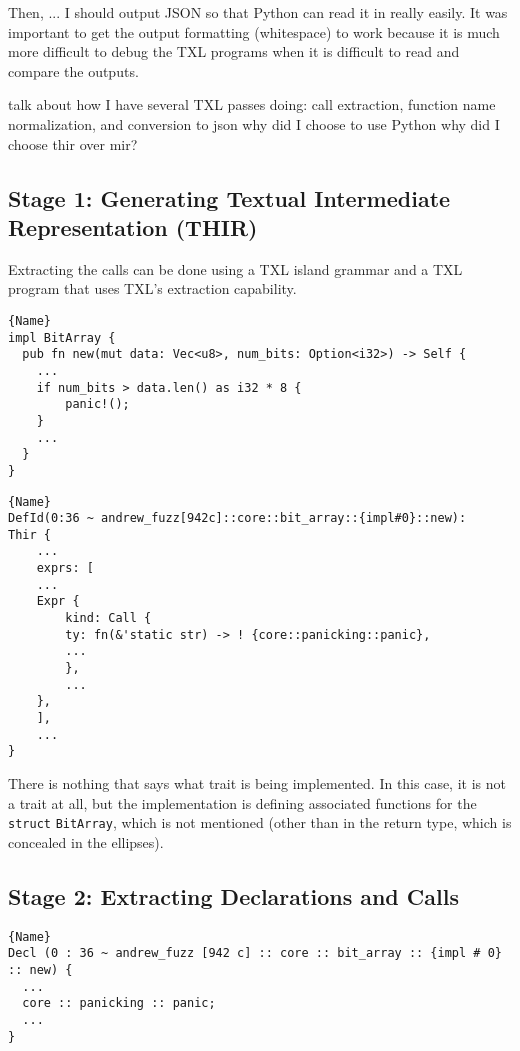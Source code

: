 \documentclass[11pt]{article}
\begin{document}
Then, ... I should output JSON so that Python can read it in really easily.
It was important to get the output formatting (whitespace) to work because it is much more difficult to debug the TXL programs when it is difficult to read and compare the outputs.

talk about how I have several TXL passes doing: call extraction, function name normalization, and conversion to json
why did I choose to use Python
why did I choose thir over mir?

\subsection{Stage 1: Generating Textual Intermediate Representation (THIR)}

Extracting the calls can be done using a TXL island grammar and a TXL program that uses TXL's extraction capability.

\begin{lstlisting}[caption=Rust Code, label=code:rust_code]{Name}
impl BitArray {
  pub fn new(mut data: Vec<u8>, num_bits: Option<i32>) -> Self {
    ...
    if num_bits > data.len() as i32 * 8 {
        panic!();
    }
    ...
  }
}
\end{lstlisting}

\begin{lstlisting}[caption=THIR-flat, label=code:thir]{Name}
DefId(0:36 ~ andrew_fuzz[942c]::core::bit_array::{impl#0}::new):
Thir {
    ...
    exprs: [
    ...
    Expr {
        kind: Call {
        ty: fn(&'static str) -> ! {core::panicking::panic},
        ...
        },
        ...
    },
    ],
    ...
}
\end{lstlisting}

There is nothing that says what trait is being implemented.
In this case, it is not a trait at all, but the implementation is defining associated functions for the \lstinline{struct} \lstinline{BitArray}, which is not mentioned (other than in the return type, which is concealed in the ellipses).

\subsection{Stage 2: Extracting Declarations and Calls}

\begin{lstlisting}[caption=Extracted Calls, label=code:all_calls]{Name}
Decl (0 : 36 ~ andrew_fuzz [942 c] :: core :: bit_array :: {impl # 0} :: new) {
  ...
  core :: panicking :: panic;
  ...
}
\end{lstlisting}
\end{document}
